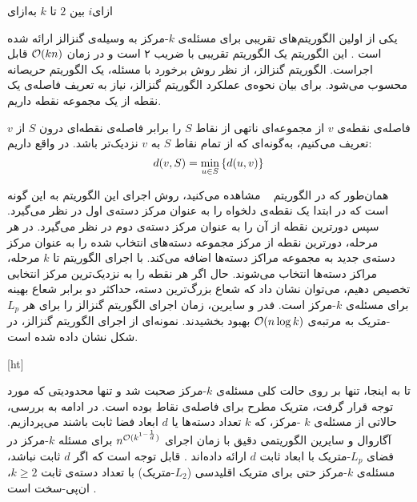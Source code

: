 ‌ازای{$i$ بین $2$ تا $k$}
‌به‌ازای

یکی از اولین الگوریتم‌های تقریبی برای مسئله‌ی $k$-مرکز به وسیله‌ی گنزالز ارائه شده است . این الگوریتم یک الگوریتم تقریبی با ضریب ۲ است و در زمان $\mathcal{O}(kn)$ قابل اجراست. الگوریتم گنزالز، از نظر روش برخورد با مسئله، یک الگوریتم حریصانه محسوب می‌شود. برای بیان نحوه‌ی عملکرد الگوریتم گنزالز، نیاز به تعریف فاصله‌ی یک نقطه از یک مجموعه نقطه داریم.

فاصله‌ی نقطه‌ی $v$ از مجموعه‌ای ناتهی از نقاط $S$ را برابر فاصله‌ی نقطه‌ای درون $S$ از $v$ تعریف می‌کنیم، به‌گونه‌ای که از تمام نقاط $S$ به $v$ نزدیک‌تر باشد. در واقع داریم:
$$d(v, S) = \min_{u \in S} \left\{  d(u, v)  \right\}$$

همان‌طور که در الگوریتم ~ مشاهده می‌کنید، روش اجرای این الگوریتم به این گونه است که در ابتدا یک نقطه‌ی دلخواه را به عنوان مرکز دسته‌ی اول در نظر می‌گیرد.
سپس دورترین نقطه از آن را به عنوان مرکز دسته‌ی دوم در نظر می‌گیرد.
در هر مرحله، دورترین نقطه از مرکز مجموعه دسته‌های انتخاب شده را به عنوان مرکز دسته‌ی جدید به مجموعه مراکز دسته‌ها اضافه می‌کند.
با اجرای الگوریتم تا $k$ مرحله، مراکز دسته‌ها انتخاب می‌شوند.
حال اگر هر نقطه را به نزدیک‌ترین مرکز انتخابی تخصیص دهیم، می‌توان نشان داد که شعاع بزرگ‌ترین دسته، حداکثر دو برابر شعاع بهینه برای مسئله‌ی $k$-مرکز است.
فدر و سایرین، زمان اجرای الگوریتم گنزالز را برای هر $L_p$-متریک به مرتبه‌ی $\mathcal{O}(n \log{k})$ بهبود بخشیدند.
نمونه‌ای از اجرای الگوریتم گنزالز، در شکل  نشان داده شده است.

[ht]

تا به اینجا، تنها بر روی حالت کلی مسئله‌ی $k$-مرکز صحبت شد و تنها محدودیتی که مورد توجه قرار گرفت، متریک مطرح برای فاصله‌ی نقاط بوده است.
در ادامه به بررسی، حالاتی از مسئله‌ی $k$ -مرکز، که $k$ تعداد دسته‌ها یا $d$ ابعاد فضا ثابت باشند می‌پردازیم.
آگاروال و سایرین الگوریتمی دقیق با زمان اجرای $n^{\mathcal{O}(k^{1 - \frac{1}{d}})}$ برای مسئله $k$-مرکز در فضای $L_p$-متریک با ابعاد ثابت $d$ ارائه داده‌اند .
قابل توجه است که اگر $d$ ثابت نباشد، مسئله‌ی $k$-مرکز حتی برای متریک اقلیدسی ($L_2$-متریک) با تعداد دسته‌ی ثابت $k \geq 2$، ان‌پی-سخت است .

